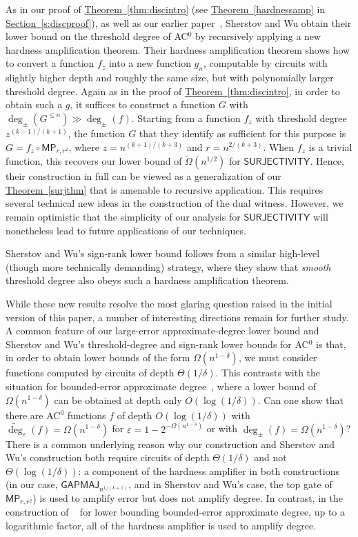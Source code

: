 \documentclass[11pt]{article}
\numberwithin{equation}{section}
\theoremstyle{definition}
\theoremstyle{plain}
\newcommand{\expref}[2]{\hyperref[#2]{#1~\ref{#2}}}
\newcommand{\GAPMAJ}{\mathsf{GAPMAJ}}
\newcommand{\eps}{\varepsilon}
\newcommand{\adeg}{\widetilde{\operatorname{deg}}}
\begin{document}
As in our proof of \expref{Theorem}{thm:discintro} (see \expref{Theorem}{hardnessamp} in \expref{Section}{s:discproof}), as well as our %
earlier paper~\cite{adegsurj},
Sherstov and Wu obtain their %
lower bound on the threshold degree of %
 AC$^0$ by recursively applying a new hardness amplification theorem. Their hardness amplification theorem shows how to convert a function $f_z$ into a new function $g_n$, computable by circuits with slightly higher depth and roughly the same size, but with polynomially larger threshold degree. Again as in the proof of \expref{Theorem}{thm:discintro}, in order to obtain such a $g$, it suffices to construct a function $G$ with $\deg_{\pm}(G^{\le n}) \gg \deg_{\pm}(f)$. Starting from a function $f_z$ with threshold degree $z^{(k-1)/(k+1)}$, the function $G$ that they identify as sufficient for this purpose is $G = f_z \circ \mathsf{MP}_{r, r^2}$, where $z = n^{(k+1)/(k+3)}$ and $r = n^{2/(k+3)}$. When $f_z$ is a trivial function, this recovers our lower bound of $\tilde{\Omega}(n^{1/2})$ for $\mathsf{SURJECTIVITY}$. Hence, their construction in full can be viewed as a generalization of our \expref{Theorem}{surjthm} that is amenable to recursive application. 
This requires several technical new ideas in the construction of the dual witness. However, we remain optimistic that the simplicity of our analysis for 
$\mathsf{SURJECTIVITY}$ will nonetheless lead to future applications of our techniques.

Sherstov and Wu's sign-rank lower bound follows from a similar high-level (though more technically demanding) strategy, where they show that \emph{smooth} threshold degree also obeys such a hardness amplification theorem.

While these new results resolve the most glaring question raised in the initial version of this %
paper, %
a number of interesting directions remain for further study. A common feature of our large-error %
approximate-degree %
lower bound and Sherstov and Wu's %
threshold-degree %
and sign-rank lower bounds for AC$^0$ is that, in order to obtain lower bounds of the form $\Omega(n^{1-\delta})$, we must consider functions computed by circuits of depth $\Theta(1/\delta)$. This contrasts with the situation for %
bounded-error %
approximate degree~\cite{adegsurj}, where a lower bound of $\Omega(n^{1-\delta})$ can be obtained at depth only $O(\log(1/\delta))$. Can one show that there are AC$^0$ functions $f$ of depth $O(\log(1/\delta))$ with $\adeg_{\eps}(f) = \Omega(n^{1-\delta})$ for $\eps = 1 - 2^{-\Omega(n^{1-\delta})}$ or with $\deg_{\pm}(f) = \Omega(n^{1-\delta})$?  There is a common underlying reason why our construction and Sherstov and Wu's construction both require circuits of depth $\Theta(1/\delta)$ and not $\Theta(\log(1/\delta))$:  a component of the hardness amplifier in both constructions (in our case, $\GAPMAJ_{n^{1/(k+1)}}$,
and in Sherstov and Wu's case, the top gate of $\mathsf{MP}_{r, r^2}$) is used to amplify error but does not amplify degree. In contrast, in the construction of 
~\cite{adegsurj} for lower bounding bounded-error approximate degree, up to a logarithmic factor, all of the hardness amplifier is used to amplify degree. 
\end{document}
